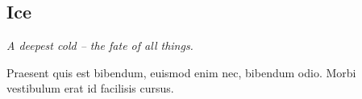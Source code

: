 \subsection{Ice}
\textit{A deepest cold -- the fate of all things.}

\begin{quotebox}
Praesent quis est bibendum, euismod enim nec, bibendum odio. Morbi vestibulum erat id facilisis cursus.
\end{quotebox}
